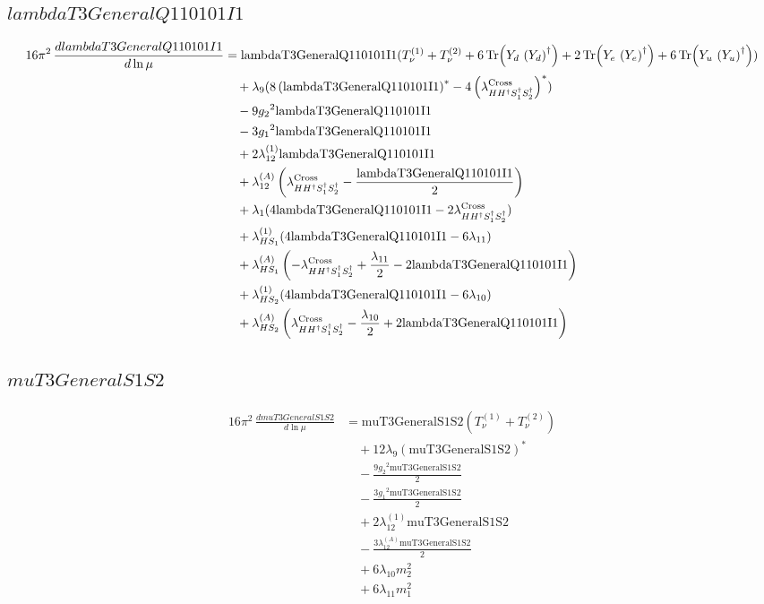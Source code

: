 \documentclass[10pt,a4paper]{article}
\begin{document}
\subsection*{$lambdaT3GeneralQ110101I1$}
\begin{align*}
16\pi^2\,\frac{d lambdaT3GeneralQ110101I1}{d\ln\mu} &=\text{lambdaT3GeneralQ110101I1} (T_{\nu}^{(1)}+T_{\nu}^{(2)}+6 \operatorname{Tr}\!\left({Y_d}\,\left({Y_d}\right)^{\dagger}\right)+2 \operatorname{Tr}\!\left({Y_e}\,\left({Y_e}\right)^{\dagger}\right)+6 \operatorname{Tr}\!\left({Y_u}\,\left({Y_u}\right)^{\dagger}\right)) \\
&\quad +{\lambda_{9}} (8 \left(\text{lambdaT3GeneralQ110101I1}\right)^{*}-4 \left({\lambda_{H H^\dagger S_1^\dagger S_2^\dagger}^{\rm Cross}}\right)^{*}) \\
&\quad -9 {g_2}^2 \text{lambdaT3GeneralQ110101I1} \\
&\quad -3 {g_1}^2 \text{lambdaT3GeneralQ110101I1} \\
&\quad +2 {\lambda_{12}^{(1)}} \text{lambdaT3GeneralQ110101I1} \\
&\quad +{\lambda_{12}^{(A)}} \left({\lambda_{H H^\dagger S_1^\dagger S_2^\dagger}^{\rm Cross}}-\frac{\text{lambdaT3GeneralQ110101I1}}{2}\right) \\
&\quad +{\lambda_1} (4 \text{lambdaT3GeneralQ110101I1}-2 {\lambda_{H H^\dagger S_1^\dagger S_2^\dagger}^{\rm Cross}}) \\
&\quad +{\lambda_{HS_1}^{(1)}} (4 \text{lambdaT3GeneralQ110101I1}-6 {\lambda_{11}}) \\
&\quad +{\lambda_{HS_1}^{(A)}} \left(-{\lambda_{H H^\dagger S_1^\dagger S_2^\dagger}^{\rm Cross}}+\frac{{\lambda_{11}}}{2}-2 \text{lambdaT3GeneralQ110101I1}\right) \\
&\quad +{\lambda_{HS_2}^{(1)}} (4 \text{lambdaT3GeneralQ110101I1}-6 {\lambda_{10}}) \\
&\quad +{\lambda_{HS_2}^{(A)}} \left({\lambda_{H H^\dagger S_1^\dagger S_2^\dagger}^{\rm Cross}}-\frac{{\lambda_{10}}}{2}+2 \text{lambdaT3GeneralQ110101I1}\right) \\
\end{align*}
\subsection*{$muT3GeneralS1S2$}
\begin{align*}
16\pi^2\,\frac{d muT3GeneralS1S2}{d\ln\mu} &=\text{muT3GeneralS1S2} (T_{\nu}^{(1)}+T_{\nu}^{(2)}) \\
&\quad +12 {\lambda_{9}} \left(\text{muT3GeneralS1S2}\right)^{*} \\
&\quad -\frac{9 {g_2}^2 \text{muT3GeneralS1S2}}{2} \\
&\quad -\frac{3 {g_1}^2 \text{muT3GeneralS1S2}}{2} \\
&\quad +2 {\lambda_{12}^{(1)}} \text{muT3GeneralS1S2} \\
&\quad -\frac{3 {\lambda_{12}^{(A)}} \text{muT3GeneralS1S2}}{2} \\
&\quad +6 {\lambda_{10}} {m_2^2} \\
&\quad +6 {\lambda_{11}} {m_1^2} \\
\end{align*}
\end{document}
